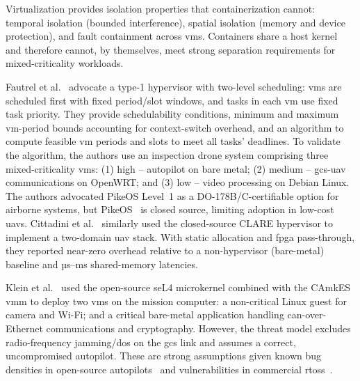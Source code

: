 Virtualization provides isolation properties that containerization cannot:
temporal isolation (bounded interference), spatial isolation (memory and device
protection), and fault containment across \glspl{vm}. Containers share a host
kernel and therefore cannot, by themselves, meet strong separation requirements
for mixed-criticality workloads.

Fautrel et al.~\cite{fautrel_hypervisor_2019} advocate a type-1 hypervisor with
two-level scheduling: \glspl{vm} are scheduled first with fixed period/slot
windows, and tasks in each \gls{vm} use fixed task priority. They provide
schedulability conditions, minimum and maximum \gls{vm}-period bounds accounting
for context-switch overhead, and an algorithm to compute feasible \gls{vm}
periods and slots to meet all tasks' deadlines.
To validate the algorithm, the authors use an inspection drone system comprising
three mixed-criticality \glspl{vm}: (1) high -- autopilot on bare metal; (2)
medium -- \gls{gcs}-\gls{uav} communications on OpenWRT; and (3) low -- video processing on
Debian Linux.
The authors advocated PikeOS Level~1 as a DO-178B/C-certifiable option for airborne systems,
but PikeOS~\cite{pikeOS} is closed source, limiting adoption in low-cost \glspl{uav}.
Cittadini et al.~\cite{cittadini_supporting_2023} similarly used the closed-source
CLARE hypervisor to implement a two-domain \gls{uav} stack. With static allocation and \gls{fpga} pass-through, they reported near-zero overhead
relative to a non-hypervisor (bare-metal) baseline and µs–ms shared-memory latencies.

Klein et al.~\cite{klein_formally_2018} used the open-source seL4 microkernel combined with
the CAmkES \gls{vmm} to deploy two \glspl{vm} on the mission computer: a
non-critical Linux guest for camera and Wi-Fi; and a critical bare-metal
application handling \gls{can}-over-Ethernet communications and cryptography.
However, the threat model excludes radio-frequency jamming/\gls{dos} on the \gls{gcs}
link and assumes a correct, uncompromised autopilot. These are strong
assumptions given known bug densities in open-source
autopilots~\cite{wang_exploratory_2021} and vulnerabilities in commercial \glspl{rtos}~\cite{buquerin2018security}.

